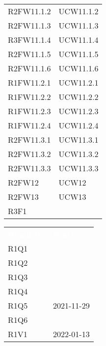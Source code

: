 \begin{table}[!htbp]
\begin{tabular}[t]{ m{}<{\centering}  m{}<{\centering} }
	R2FW11.1.2 & UCW11.1.2 \\
		
	R2FW11.1.3 & UCW11.1.3 \\
	
	R3FW11.1.4 & UCW11.1.4 \\
	
	R2FW11.1.5 & UCW11.1.5 \\
	
	R2FW11.1.6 & UCW11.1.6 \\
	
	R1FW11.2.1 & UCW11.2.1 \\
	
	R1FW11.2.2 & UCW11.2.2 \\	
	
	R1FW11.2.3 & UCW11.2.3 \\
	
	R1FW11.2.4 & UCW11.2.4 \\
	
	R2FW11.3.1 & UCW11.3.1 \\
	
	R2FW11.3.2 & UCW11.3.2 \\
	
	R2FW11.3.3 & UCW11.3.3 \\ 	 	

	R2FW12 & UCW12\\

	R2FW13 & UCW13\\
	
	R3F1 & \Di \\
	
\end{tabular}
\begin{tabular}[t]{ m{}<{\centering}  m{}<{\centering} }
	\rowcolor{darkblue}
	\textcolor{white}{\textbf{Requisito}} &\textcolor{white}{\textbf{Fonti}}\\ 
	
	R1Q1 & \Di \\
	
	R1Q2 & \Ca \\
	
	R1Q3 & \Ca \\
	
	R1Q4 &  \Ca \\
	
	R1Q5 & \Vi{} 2021-11-29\\

	R1Q6 & \Di \\

	R1V1 & \Vi{} 2022-01-13 \\	


\end{tabular}
\end{table}

